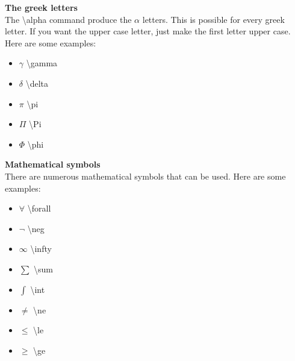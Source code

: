 \bigskip

\textbf{The greek letters}\\
The \textbackslash alpha command produce the $\alpha$ letters. This is possible for every greek letter. If you want the upper case letter, just make the first letter upper case. Here are some examples:

\begin{itemize}
\item $\gamma$ \hspace{10pt} \textbackslash gamma
\item $\delta$ \hspace{10pt} \textbackslash delta
\item $\pi$ \hspace{10pt} \textbackslash pi
\item $\Pi$ \hspace{10pt} \textbackslash Pi
\item $\Phi$ \hspace{10pt} \textbackslash phi
\end{itemize}

\bigskip

\textbf{Mathematical symbols}\\
There are numerous mathematical symbols that can be used. Here are some examples:

\begin{itemize}
\item $\forall$ \hspace{10pt} \textbackslash forall
\item $\neg$ \hspace{10pt} \textbackslash neg
\item $\infty$ \hspace{10pt} \textbackslash infty
\item $\sum$ \hspace{10pt} \textbackslash sum
\item $\int$ \hspace{10pt} \textbackslash int
\item $\ne$ \hspace{10pt} \textbackslash ne
\item $\le$ \hspace{10pt} \textbackslash le
\item $\ge$ \hspace{10pt} \textbackslash ge
\end{itemize}

\bigskip

